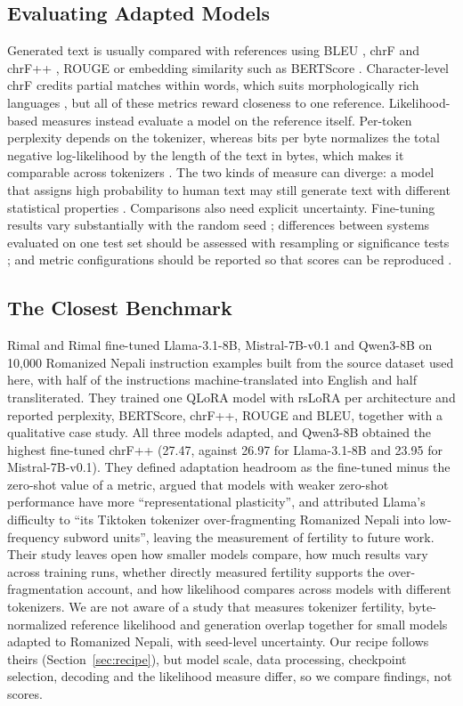 \documentclass{article}
\begin{document}
\subsection{Evaluating Adapted Models}

Generated text is usually compared with references using BLEU \citep{papineni2002}, chrF and chrF++ \citep{popovic2015,popovic2017}, ROUGE \citep{lin2004} or embedding similarity such as BERTScore \citep{zhang2020}. Character-level chrF credits partial matches within words, which suits morphologically rich languages \citep{popovic2015}, but all of these metrics reward closeness to one reference. Likelihood-based measures instead evaluate a model on the reference itself. Per-token perplexity depends on the tokenizer, whereas bits per byte normalizes the total negative log-likelihood by the length of the text in bytes, which makes it comparable across tokenizers \citep{gao2020}. The two kinds of measure can diverge: a model that assigns high probability to human text may still generate text with different statistical properties \citep{meister2021}. Comparisons also need explicit uncertainty. Fine-tuning results vary substantially with the random seed \citep{dodge2020}; differences between systems evaluated on one test set should be assessed with resampling or significance tests \citep{koehn2004,dror2018}; and metric configurations should be reported so that scores can be reproduced \citep{post2018}.

\subsection{The Closest Benchmark}\label{sec:prior}

Rimal and Rimal \citep{rimal2026} fine-tuned Llama-3.1-8B, Mistral-7B-v0.1 and Qwen3-8B on 10,000 Romanized Nepali instruction examples built from the source dataset used here, with half of the instructions machine-translated into English and half transliterated. They trained one QLoRA model with rsLoRA per architecture and reported perplexity, BERTScore, chrF++, ROUGE and BLEU, together with a qualitative case study. All three models adapted, and Qwen3-8B obtained the highest fine-tuned chrF++ (27.47, against 26.97 for Llama-3.1-8B and 23.95 for Mistral-7B-v0.1). They defined adaptation headroom as the fine-tuned minus the zero-shot value of a metric, argued that models with weaker zero-shot performance have more “representational plasticity”, and attributed Llama's difficulty to “its Tiktoken tokenizer over-fragmenting Romanized Nepali into low-frequency subword units”, leaving the measurement of fertility to future work. Their study leaves open how smaller models compare, how much results vary across training runs, whether directly measured fertility supports the over-fragmentation account, and how likelihood compares across models with different tokenizers. We are not aware of a study that measures tokenizer fertility, byte-normalized reference likelihood and generation overlap together for small models adapted to Romanized Nepali, with seed-level uncertainty. Our recipe follows theirs (Section~\ref{sec:recipe}), but model scale, data processing, checkpoint selection, decoding and the likelihood measure differ, so we compare findings, not scores.
\end{document}

